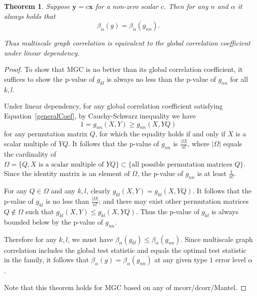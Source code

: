 \documentclass[11pt]{article}
\providecommand{\mb}[1]{\boldsymbol{#1}}
\newtheorem{appThm}{Theorem}
\begin{document}
\begin{appThm}
Suppose $\mb{y}=c\mb{x}$ for a non-zero scalar $c$. Then for any $n$ and $\alpha$ it always holds that
\begin{equation}
\beta_{\alpha}(g) = \beta_{\alpha}(g_{nn}).
\end{equation}

Thus multiscale graph correlation is equivalent to the global correlation coefficient under linear dependency.
\end{appThm}
\begin{proof}
To show that MGC is no better than its global correlation coefficient, it suffices to show the p-value of $g_{kl}$ is always no less than the p-value of $g_{nn}$ for all $k,l$.


Under linear dependency, for any global correlation coefficient satisfying Equation~\ref{generalCoef}, by Cauchy-Schwarz inequality we have
\begin{equation}
1=g_{nn}(X, Y) \geq g_{nn}(X, YQ)
\end{equation}
for any permutation matrix $Q$, for which the equality holds if and only if $X$ is a scalar multiple of $YQ$. It follows that the p-value of $g_{nn}$ is $\frac{|\Omega|}{n!}$, where $|\Omega|$ equals the cardinality of $\Omega=\{Q, X \mbox{ is a scalar multiple of }YQ\} \subset \{\mbox{all possible permutation matrices }Q\}$. Since the identity matrix is an element of $\Omega$, the p-value of $g_{nn}$ is at least $\frac{1}{n!}$.

For any $Q \in \Omega$ and any $k,l$, clearly $g_{kl}(X,Y)=g_{kl}(X,YQ)$. It follows that the p-value of $g_{kl}$ is no less than $\frac{|\Omega|}{n!}$; and there may exist other permutation matrices $Q \notin \Omega$ such that $g_{kl}(X,Y) \leq g_{kl}(X,YQ)$. Thus the p-value of $g_{kl}$ is always bounded below by the p-value of $g_{nn}$.

Therefore for any $k,l$, we must have $\beta_{\alpha}(g_{kl}) \leq \beta_{\alpha}(g_{nn})$. Since multiscale graph correlation includes the global test statistic and equals the optimal test statistic in the family, it follows that $\beta_{\alpha}(g) = \beta_{\alpha}(g_{nn})$ at any given type $1$ error level $\alpha$.

Note that this theorem holds for MGC based on any of mcorr/dcorr/Mantel.
\end{proof}
\end{document}
